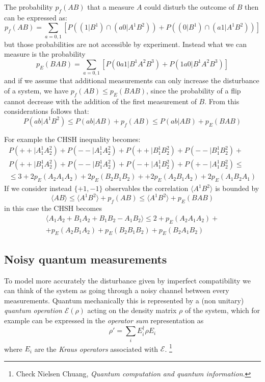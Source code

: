 \documentclass[a4paper]{article}
\newcommand{\acron}[1]{\textsc{#1}}
\newcommand{\qE}{\mathcal{E}}
\newcommand{\adj}{\dagger}
\theoremstyle{definition}
\begin{document}
The probability $p_f(AB)$ that a measure $A$ could disturb the outcome of $B$
then can be expressed as:
\begin{equation}
    p_f(AB) = \sum_{a=0,1} \left[P\left((1|B^1) \cap
    (a0|A^1 B^2)\right) 
    + P\left((0|B^1) \cap (a1|A^1 B^2)\right)\right]
\end{equation}
but those probabilities are not accessible by experiment.
Instead what we can measure is the probability
\begin{equation}
    p_E (BAB) = \sum_{a=0,1}
    \left[P\left(0a1|B^1A^2B^3\right)+P\left(1a0|B^1A^2B^3\right)\right]
\end{equation}
and if we assume that additional measurements can only increase the disturbance
of a system, we have $p_f(AB) \le p_E (BAB)$, since the probability of a flip
cannot decrease with the addition of the first measurement of $B$.
From this considerations follows that:
\begin{equation}
    P\left(ab|A^1B^2\right) \le P(ab|AB) + p_f(AB) \le P(ab|AB) + p_E(BAB) 
    \label{eq:prob_noncomp}
\end{equation}

For example the \acron{CHSH} inequality becomes:
\begin{multline}
    P(++| A_1^1 A_2^2) + P(--| A_1^1 A_2^2) +
    P(++| B_1^1 B_2^2) + P(--| B_1^1 B_2^2) +\\
    P(++| B_1^1 A_2^2) + P(--| B_1^1 A_2^2) +
    P(-+| A_1^1 B_2^2) + P(+-| A_1^1 B_2^2) \le \\
    \le 3 + 2 p_E(A_2A_1A_2) + 2p_E(B_2B_1B_2) +
    +2 p_E(A_2B_1A_2) + 2 p_E(A_1B_2A_1)
\end{multline}
If we consider instead $\{+1,-1\}$ observables the correlation
$\langle{A^1B^2}\rangle$ is bounded by
\begin{equation}
    \langle{AB}\rangle \le \langle{A^1B^2}\rangle + p_f(AB) \le
    \langle{A^1B^2}\rangle +  p_E(BAB)
\end{equation}
in this case the \acron{CHSH} becomes
\begin{multline}
    \langle{A_1A_2 + B_1A_2 + B_1B_2 - A_1B_2}\rangle \le 
    2 +  p_E(A_2A_1A_2) +\\ 
    + p_E(A_2B_1A_2) +  p_E(B_2B_1B_2) + p_E(B_2A_1B_2)
\end{multline}

\subsection{Noisy quantum measurements}
To model more accurately the disturbance given by imperfect compatibility
we can think of the system as going through a noisy channel between every
measurements.
Quantum mechanically this is represented by a (non unitary) \emph{quantum
operation} $\qE(\rho)$ acting on the density matrix $\rho$ of the system, which
for example can be expressed in the \emph{operator sum} representation as
\begin{equation}
    \rho' = \sum_i E_i^\adj \rho E_i
    \label{eq:kraus_evolution}
\end{equation}
where $E_i$ are the \emph{Kraus operators} associated with $\qE$.
\footnote{Check Nielsen Chuang, \emph{Quantum computation and quantum
information}.}
\end{document}
